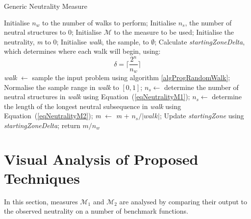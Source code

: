 \documentclass[conference]{IEEEtran}
\begin{document}
\begin{algorithm}[!t]
	\caption{Generic Neutrality Measure}
	\label{algNeutralityMeasure}
	\begin{algorithmic}
		\STATE Initialise $n_w$ to the number of walks to perform;
		\STATE Initialise $n_s$, the number of neutral structures to 0;
		\STATE Initialise $\mathcal{M}$ to the measure to be used;
		\STATE Initialise the neutrality, \textit{m} to 0;
		\STATE Initialise \textit{walk}, the sample, to $\emptyset$;
		\STATE Calculate \textit{startingZoneDelta}, which determines where each walk will begin, using:
		\begin{equation}
			\label{eqStartingZoneDelta}
			\delta = \biggr\lceil \frac{2^n}{n_w} \biggr\rceil
		\end{equation}
			\STATE \textit{walk} $\gets$ sample the input problem using algorithm \ref{algProgRandomWalk};
			\STATE Normalise the sample range in \textit{walk} to $[0,1]$;
				\STATE $n_s \gets$ determine the number of neutral structures in \textit{walk} using Equation~(\ref{eqNeutralityM1});
			\ELSE
				\STATE $n_s \gets$ determine the length of the longest neutral subsequence in \textit{walk} using Equation~(\ref{eqNeutralityM2});		
			\ENDIF
			\STATE \textit{m} $\gets$ \textit{m} + $n_s/\lvert\textit{walk}\rvert$;	
			\STATE Update \textit{startingZone} using \textit{startingZoneDelta};
		\ENDFOR
		\STATE return $\textit{m}/n_w$
	\end{algorithmic}
\end{algorithm}

\section{Visual Analysis of Proposed Techniques}
\label{visualAnalysis}
In this section, measures $\mathcal{M}_1$ and $\mathcal{M}_2$ are analysed by comparing their output to the observed neutrality on a number of benchmark functions. 
\end{document}
